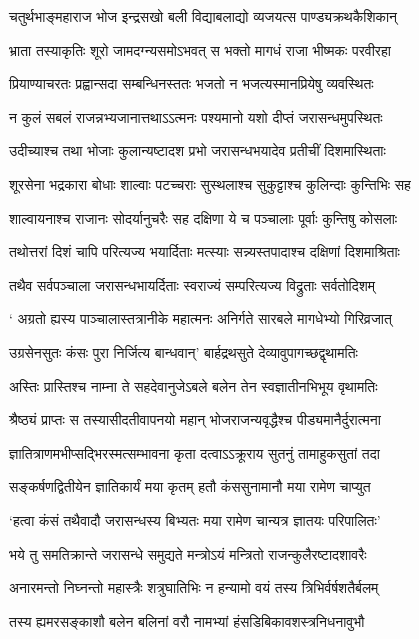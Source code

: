 \twolineshloka
{चतुर्थभाङ्महाराज भोज इन्द्रसखो बली}
{विद्याबलाद्यो व्यजयत्स पाण्ड्यक्रथकैशिकान्}


\twolineshloka
{भ्राता तस्याकृतिः शूरो जामदग्न्यसमोऽभवत्}
{स भक्तो मागधं राजा भीष्मकः परवीरहा}


\twolineshloka
{प्रियाण्याचरतः प्रह्वान्सदा सम्बन्धिनस्ततः}
{भजतो न भजत्यस्मानप्रियेषु व्यवस्थितः}


\twolineshloka
{न कुलं सबलं राजन्नभ्यजानात्तथाऽऽत्मनः}
{पश्यमानो यशो दीप्तं जरासन्धमुपस्थितः}


\twolineshloka
{उदीच्याश्च तथा भोजाः कुलान्यष्टादश प्रभो}
{जरासन्धभयादेव प्रतीचीं दिशमास्थिताः}


\twolineshloka
{शूरसेना भद्रकारा बोधाः शाल्वाः पटच्चराः}
{सुस्थलाश्च सुकुट्टाश्च कुलिन्दाः कुन्तिभिः सह}


\twolineshloka
{शाल्वायनाश्च राजानः सोदर्यानुचरैः सह}
{दक्षिणा ये च पञ्चालाः पूर्वाः कुन्तिषु कोसलाः}


\twolineshloka
{तथोत्तरां दिशं चापि परित्यज्य भयार्दिताः}
{मत्स्याः सन्न्यस्तपादाश्च दक्षिणां दिशमाश्रिताः}


\twolineshloka
{तथैव सर्वपञ्चाला जरासन्धभायर्दिताः}
{स्वराज्यं सम्परित्यज्य विद्रुताः सर्वतोदिशम्}


\twolineshloka
{` अग्रतो ह्यस्य पाञ्चालास्तत्रानीके महात्मनः}
{अनिर्गते सारबले मागधेभ्यो गिरिव्रजात्}


\twolineshloka
{उग्रसेनसुतः कंसः पुरा निर्जित्य बान्धवान्'}
{बार्हद्रथसुते देव्यावुपागच्छद्वृथामतिः}


\twolineshloka
{अस्तिः प्रास्तिश्च नाम्ना ते सहदेवानुजेऽबले}
{बलेन तेन स्वज्ञातीनभिभूय वृथामतिः}


\twolineshloka
{श्रैष्ठ्यं प्राप्तः स तस्यासीदतीवापनयो महान्}
{भोजराजन्यवृद्धैश्च पीड्यमानैर्दुरात्मना}


\twolineshloka
{ज्ञातित्राणमभीप्सद्भिरस्मत्सम्भावना कृता}
{दत्वाऽऽक्रूराय सुतनुं तामाहुकसुतां तदा}


\twolineshloka
{सङ्कर्षणद्वितीयेन ज्ञातिकार्यं मया कृतम्}
{हतौ कंससुनामानौ मया रामेण चाप्युत}


\twolineshloka
{`हत्वा कंसं तथैवादौ जरासन्धस्य बिभ्यतः}
{मया रामेण चान्यत्र ज्ञातयः परिपालितः'}


\twolineshloka
{भये तु समतिक्रान्ते जरासन्धे समुद्यते}
{मन्त्रोऽयं मन्त्रितो राजन्कुलैरष्टादशावरैः}


\twolineshloka
{अनारमन्तो निघ्नन्तो महास्त्रैः शत्रुघातिभिः}
{न हन्यामो वयं तस्य त्रिभिर्वर्षशतैर्बलम्}


\twolineshloka
{तस्य ह्यमरसङ्काशौ बलेन बलिनां वरौ}
{नामभ्यां हंसडिबिकावशस्त्रनिधनावुभौ}



